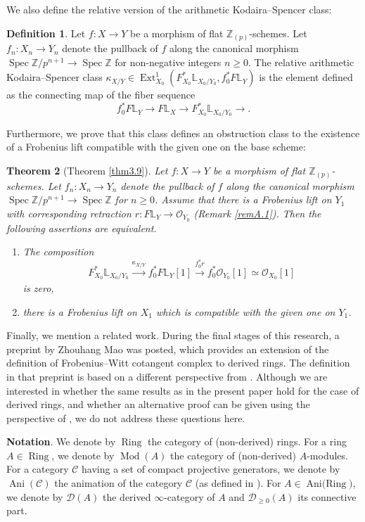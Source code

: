 \documentclass[11pt, a4paper]{amsart}
\theoremstyle{plain}
\newtheorem{theorem}{Theorem}[section]
\theoremstyle{definition}
\newtheorem{definition}[theorem]{Definition}
\begin{document}
We also define the relative version of the arithmetic Kodaira--Spencer class:
\begin{definition}
    Let $f:X\to Y$ be a morphism of flat $\mathbb Z_{(p)}$-schemes. Let $f_n:X_n\to Y_n$ denote the pullback of $f$ along the canonical morphism $\operatorname{Spec}\mathbb Z/p^{n+1}\to \operatorname{Spec}\mathbb Z$ for non-negative integers $n\ge0$. The relative arithmetic Kodaira--Spencer class $\kappa_{X/Y}\in \operatorname{Ext}_{X_0}^1(F_{X_0}^*\mathbb L_{X_0/Y_0},f_0^*F\mathbb L_Y)$ is the element defined as the connecting map of the fiber sequence\[f_0^*F\mathbb L_Y\to F\mathbb L_X\to F_{X_0}^*\mathbb L_{X_0/Y_0}\to. \] 
\end{definition}
Furthermore, we prove that this class defines an obstruction class to the existence of a Frobenius lift compatible with the given one on the base scheme:
\begin{theorem}[Theorem \ref{thm3.9}]
    Let $f:X\to Y$ be a morphism of flat $\mathbb Z_{(p)}$-schemes. Let $f_n:X_n\to Y_n$ denote the pullback of $f$ along the canonical morphism $\operatorname{Spec}\mathbb Z/p^{n+1}\to \operatorname{Spec}\mathbb Z$ for $n\ge0$. Assume that there is a Frobenius lift on $Y_1$ with corresponding retraction $r:F\mathbb L_Y\to \mathcal O_{Y_0}$ (Remark \ref{remA.1}). Then the following assertions are equivalent.
    \begin{enumerate}
        \item The composition\[F_{X_0}^*\mathbb L_{X_0/Y_0}\xrightarrow[]{\kappa_{X/Y}}f_0^*F\mathbb L_Y[1]\xrightarrow[]{f_0^*r}f_0^*\mathcal O_{Y_0}[1]\simeq \mathcal O_{X_0}[1]\] is zero,
        \item there is a Frobenius lift on $X_1$ which is compatible with the given one on $Y_1$.
    \end{enumerate}
\end{theorem}

Finally, we mention a related work. During the final stages of this research, a preprint \cite{Mao26} by Zhouhang Mao was posted, which provides an extension of the definition of Frobenius--Witt cotangent complex to derived rings. The definition in that preprint is based on a different perspective from \cite{Shi26}. Although we are interested in whether the same results as in the present paper hold for the case of derived rings, and whether an alternative proof can be given using the  perspective of \cite{Mao26}, we do not address these questions here.


\vspace{2mm}
\textbf{Notation}.
We denote by $\operatorname{Ring}$ the category of (non-derived) rings. For a ring $A\in \operatorname{Ring}$, we denote by $\operatorname{Mod}(A)$ the category of (non-derived) $A$-modules. For a category $\mathcal C$ having a set of compact projective generators, we denote by $\operatorname{Ani}(\mathcal C)$ the animation of the category $\mathcal C$ (as defined in \cite[Section 5.1]{CS24}). For $A\in \operatorname{Ani(Ring})$, we denote by $\mathcal D(A)$ the derived $\infty$-category of $A$ and $\mathcal D_{\ge 0}(A)$ its connective part.
\end{document}

